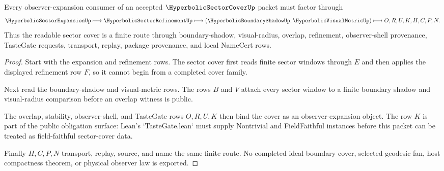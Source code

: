 \begin{theorem}
\label{thm:hyperbolic-sector-cover-refinement-route}
Every observer-expansion consumer of an accepted $\HyperbolicSectorCoverUp$ packet must factor through
$$
\HyperbolicSectorExpansionUp
\longmapsto
\HyperbolicSectorRefinementUp
\longmapsto
(\HyperbolicBoundaryShadowUp,\HyperbolicVisualMetricUp)
\longmapsto
O,R,U,K,H,C,P,N .
$$
Thus the readable sector cover is a finite route through boundary-shadow, visual-radius, overlap, refinement, observer-shell provenance, TasteGate requests, transport, replay, package provenance, and local NameCert rows.
\end{theorem}
\begin{proof}
Start with the expansion and refinement rows. The sector cover first reads finite sector windows through $E$ and then applies the displayed refinement row $F$, so it cannot begin from a completed cover family.

Next read the boundary-shadow and visual-metric rows. The rows $B$ and $V$ attach every sector window to a finite boundary shadow and visual-radius comparison before an overlap witness is public.

The overlap, stability, observer-shell, and TasteGate rows $O,R,U,K$ then bind the cover as an observer-expansion object. The row $K$ is part of the public obligation surface: Lean's `TasteGate.lean` must supply Nontrivial and FieldFaithful instances before this packet can be treated as field-faithful sector-cover data.

Finally $H,C,P,N$ transport, replay, source, and name the same finite route. No completed ideal-boundary cover, selected geodesic fan, host compactness theorem, or physical observer law is exported.
\end{proof}



